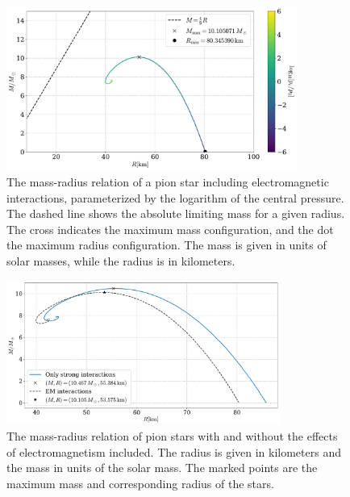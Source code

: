 \begin{figure}[!htb]
    \centering
    \includegraphics[width=0.85\textwidth]{../scripts/figurer/pion_star/mass_radius_pion_star_EM.pdf}
    \caption{
        The mass-radius relation of a pion star including electromagnetic interactions, parameterized by the logarithm of the central pressure.
        The dashed line shows the absolute limiting mass for a given radius.
        The cross indicates the maximum mass configuration, and the dot the maximum radius configuration.
        The mass is given in units of solar masses, while the radius is in kilometers.
        }
    \label{fig: mass-radius relation leading order pion star with em interaction}
\end{figure}


\begin{figure}[!htb]
    \centering
    \includegraphics[width=0.8\textwidth]{../scripts/figurer/pion_star/mass_radius_pion_star_compare.pdf}
    \caption{
        The mass-radius relation of pion stars with and without the effects of electromagnetism included.
        The radius is given in kilometers and the mass in units of the solar mass.
        The marked points are the maximum mass and corresponding radius of the stars.
        }
        \label{fig: mass-radius relation comparison}
\end{figure}


